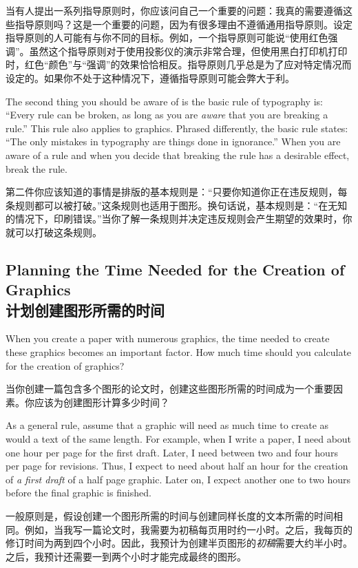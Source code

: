 当有人提出一系列指导原则时，你应该问自己一个重要的问题：我真的需要遵循这些指导原则吗？这是一个重要的问题，因为有很多理由不遵循通用指导原则。设定指导原则的人可能有与你不同的目标。例如，一个指导原则可能说“使用红色强调”。虽然这个指导原则对于使用投影仪的演示非常合理，但使用黑白打印机打印时，红色“颜色”与“强调”的效果恰恰相反。指导原则几乎总是为了应对特定情况而设定的。如果你不处于这种情况下，遵循指导原则可能会弊大于利。

The second thing you should be aware of is the basic rule of typography is:
``Every rule can be broken, as long as you are \emph{aware} that you are
breaking a rule.'' This rule also applies to graphics. Phrased differently, the
basic rule states: ``The only mistakes in typography are things done in
ignorance.'' When you are aware of a rule and when you decide that breaking the
rule has a desirable effect, break the rule.

第二件你应该知道的事情是排版的基本规则是：“只要你知道你正在违反规则，每条规则都可以被打破。”这条规则也适用于图形。换句话说，基本规则是：“在无知的情况下，印刷错误。”当你了解一条规则并决定违反规则会产生期望的效果时，你就可以打破这条规则。


\subsection{Planning the Time Needed for the Creation of Graphics\\计划创建图形所需的时间}

When you create a paper with numerous graphics, the time needed to create these
graphics becomes an important factor. How much time should you calculate for
the creation of graphics?

当你创建一篇包含多个图形的论文时，创建这些图形所需的时间成为一个重要因素。你应该为创建图形计算多少时间？

As a general rule, assume that a graphic will need as much time to create as
would a text of the same length. For example, when I write a paper, I need
about one hour per page for the first draft. Later, I need between two and four
hours per page for revisions. Thus, I expect to need about half an hour for the
creation of \emph{a first draft} of a half page graphic. Later on, I expect
another one to two hours before the final graphic is finished.

一般原则是，假设创建一个图形所需的时间与创建同样长度的文本所需的时间相同。例如，当我写一篇论文时，我需要为初稿每页用时约一小时。之后，我每页的修订时间为两到四个小时。因此，我预计为创建半页图形的\emph{初稿}需要大约半小时。之后，我预计还需要一到两个小时才能完成最终的图形。

